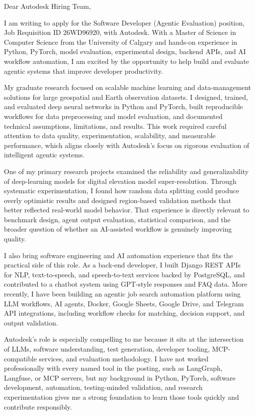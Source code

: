 \documentclass[11pt]{letter}
\begin{document}
\begin{letter}{}

\opening{Dear Autodesk Hiring Team,}

I am writing to apply for the Software Developer (Agentic Evaluation) position, Job Requisition ID 26WD96920, with Autodesk. With a Master of Science in Computer Science from the University of Calgary and hands-on experience in Python, PyTorch, model evaluation, experimental design, backend APIs, and AI workflow automation, I am excited by the opportunity to help build and evaluate agentic systems that improve developer productivity.

My graduate research focused on scalable machine learning and data-management solutions for large geospatial and Earth observation datasets. I designed, trained, and evaluated deep neural networks in Python and PyTorch, built reproducible workflows for data preprocessing and model evaluation, and documented technical assumptions, limitations, and results. This work required careful attention to data quality, experimentation, scalability, and measurable performance, which aligns closely with Autodesk's focus on rigorous evaluation of intelligent agentic systems.

One of my primary research projects examined the reliability and generalizability of deep-learning models for digital elevation model super-resolution. Through systematic experimentation, I found how random data splitting could produce overly optimistic results and designed region-based validation methods that better reflected real-world model behavior. That experience is directly relevant to benchmark design, agent output evaluation, statistical comparison, and the broader question of whether an AI-assisted workflow is genuinely improving quality.

I also bring software engineering and AI automation experience that fits the practical side of this role. As a back-end developer, I built Django REST APIs for NLP, text-to-speech, and speech-to-text services backed by PostgreSQL, and contributed to a chatbot system using GPT-style responses and FAQ data. More recently, I have been building an agentic job search automation platform using LLM workflows, AI agents, Docker, Google Sheets, Google Drive, and Telegram API integrations, including workflow checks for matching, decision support, and output validation.

Autodesk's role is especially compelling to me because it sits at the intersection of LLMs, software understanding, test generation, developer tooling, MCP-compatible services, and evaluation methodology. I have not worked professionally with every named tool in the posting, such as LangGraph, Langfuse, or MCP servers, but my background in Python, PyTorch, software development, automation, testing-minded validation, and research experimentation gives me a strong foundation to learn those tools quickly and contribute responsibly.


\end{letter}
\end{document}

